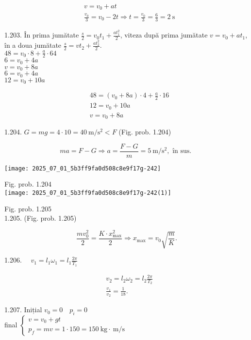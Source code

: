 $$
\begin{aligned}
& v=v_{0}+a t \\
& \frac{v_{0}}{3}=v_{0}-2 t \Rightarrow t=\frac{v_{0}}{3}=\frac{6}{3}=2 \mathrm{~s}
\end{aligned}
$$

1.203. În prima jumătate $\frac{s}{2}=v_{0} t_{1}+\frac{a t_{1}^{2}}{2}$, viteza după prima jumătate $v=v_{0}+a t_{1}$, în a doua jumătate $\frac{s}{2}=v t_{2}+\frac{a t_{2}^{2}}{2}$.\\
$48=v_{0} \cdot 8+\frac{a}{2} \cdot 64$\\
$6=v_{0}+4 a$\\
$v=v_{0}+8 a$\\
$6=v_{0}+4 a$\\
$12=v_{0}+10 a$

$$
\begin{aligned}
& 48=\left(v_{0}+8 a\right) \cdot 4+\frac{a}{2} \cdot 16 \\
& 12=v_{0}+10 a \\
& v=v_{0}+8 a
\end{aligned}
$$

1.204. $G=m g=4 \cdot 10=40 \mathrm{~m} / \mathrm{s}^{2}<F$ (Fig. prob. 1.204)

$$
m a=F-G \Rightarrow a=\frac{F-G}{m}=5 \mathrm{~m} / \mathrm{s}^{2}, \text { în sus. }
$$

\begin{center}
\texttt{[image: 2025\_07\_01\_5b3ff9fa0d508c8e9f17g-242]}
\end{center}

Fig. prob. 1.204\\
\texttt{[image: 2025\_07\_01\_5b3ff9fa0d508c8e9f17g-242(1)]}

Fig. prob. 1.205\\
1.205. (Fig. prob. 1.205)

$$
\frac{m v_{0}^{2}}{2}=\frac{K \cdot x_{\max }^{2}}{2} \Rightarrow x_{\max }=v_{0} \sqrt{\frac{m}{K}} .
$$

1.206. $\quad v_{1}=l_{1} \omega_{1}=l_{1} \frac{2 \pi}{T_{1}}$

$$
\begin{aligned}
& v_{2}=l_{2} \omega_{2}=l_{2} \frac{2 \pi}{T_{2}} \\
& \frac{v_{1}}{v_{2}}=\frac{1}{18} .
\end{aligned}
$$

1.207. Inițial $v_{0}=0 \quad p_{i}=0$\\
final $\left\{\begin{array}{l}v=v_{0}+g t \\ p_{f}=m v=1 \cdot 150=150 \mathrm{~kg} \cdot \mathrm{~m} / \mathrm{s}\end{array}\right.$

